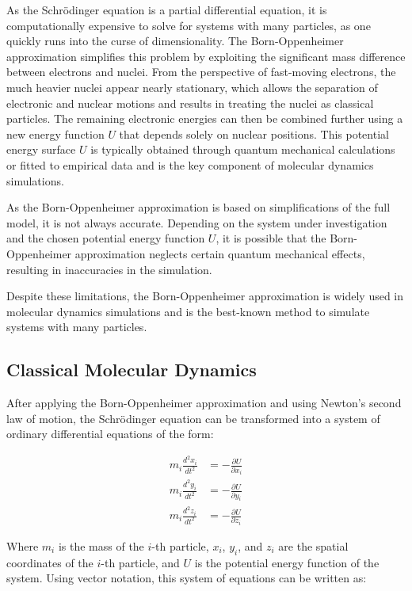 As the Schrödinger equation is a partial differential equation, it is computationally expensive to solve for systems with many particles, as one quickly runs into the curse of dimensionality. The Born-Oppenheimer approximation simplifies this problem by exploiting the significant mass difference between electrons and nuclei. From the perspective of fast-moving electrons, the much heavier nuclei appear nearly stationary, which allows the separation of electronic and nuclear motions and results in treating the nuclei as classical particles. The remaining electronic energies can then be combined further using a new energy function $U$ that depends solely on nuclear positions.
This potential energy surface $U$ is typically obtained through quantum mechanical calculations or fitted to empirical data and is the key component of molecular dynamics simulations.

As the Born-Oppenheimer approximation is based on simplifications of the full model, it is not always accurate. Depending on the system under investigation and the chosen potential energy function $U$, it is possible that the Born-Oppenheimer approximation neglects certain quantum mechanical effects, resulting in inaccuracies in the simulation.

Despite these limitations, the Born-Oppenheimer approximation is widely used in molecular dynamics simulations and is the best-known method to simulate systems with many particles.

\subsection{Classical Molecular Dynamics}

After applying the Born-Oppenheimer approximation and using Newton's second law of motion, the Schrödinger equation can be transformed into a system of ordinary differential equations of the form:

\begin{align}
      m_i \frac{d^2 x_i}{dt^2} & = -\frac{\partial U}{\partial x_i} \\
      m_i \frac{d^2 y_i}{dt^2} & = -\frac{\partial U}{\partial y_i} \\
      m_i \frac{d^2 z_i}{dt^2} & = -\frac{\partial U}{\partial z_i}
\end{align}

Where $m_i$ is the mass of the $i$-th particle, $x_i$, $y_i$, and $z_i$ are the spatial coordinates of the $i$-th particle, and $U$ is the potential energy function of the system. Using vector notation, this system of equations can be written as:

